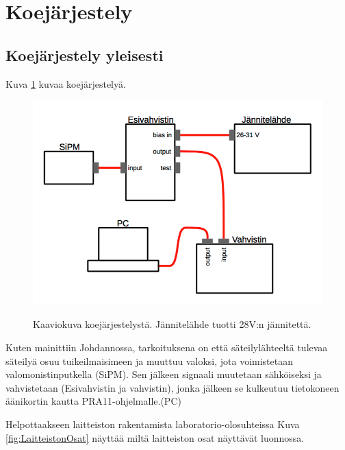 \documentclass[a4paper, 12pt]{article}
\begin{document}
\section{Koejärjestely}
\subsection{Koejärjestely yleisesti}
Kuva \ref{fig:Koejarjestely} kuvaa koejärjestelyä. 

\begin{figure}[!hbt]
\includegraphics[scale=0.7]{Koejarjestely}
\label{fig:Koejarjestely}
\caption{Kaaviokuva koejärjestelystä. Jännitelähde tuotti 28V:n jännitettä.}
\end{figure}

Kuten mainittiin Johdannossa, tarkoituksena on että säteilylähteeltä tulevaa säteilyä osuu tuikeilmaisimeen ja muuttuu valoksi, jota voimistetaan valomonistinputkella (SiPM). Sen jälkeen signaali muutetaan sähköiseksi ja vahvistetaan (Esivahvistin ja vahvistin), jonka jälkeen se kulkeutuu tietokoneen äänikortin kautta PRA11-ohjelmalle.(PC)

Helpottaakseen laitteiston rakentamista laboratorio-olosuhteissa Kuva \ref{fig:LaitteistonOsat} näyttää miltä laitteiston osat näyttävät luonnossa.
\end{document}
